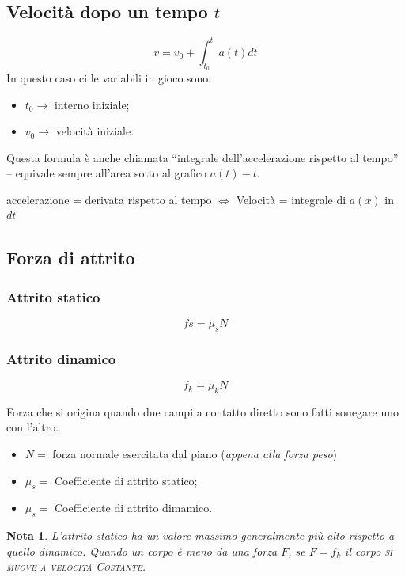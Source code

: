 \documentclass{book}
\newtheorem{nota}{Nota}[section]
\begin{document}
\subsection{Velocità dopo un tempo $t$}
\label{sec:veldopotempt}
\begin{equation}
  \label{eq:veldopuntemptacvar}
  v=v_0+\int^t_{t_0}a(t)dt
\end{equation}
In questo caso ci le variabili in gioco sono:
\begin{itemize}
\item $t_0\to$ interno iniziale;
\item $v_0\to$ velocità iniziale.
\end{itemize}
Questa formula è anche chiamata ``integrale dell'accelerazione rispetto al tempo'' -- equivale sempre all'area sotto al grafico $a(t)-t$.
\begin{center}
  accelerazione = derivata rispetto al tempo $\Leftrightarrow$ Velocità = integrale di $a(x)$ in $dt$
\end{center}

\subsection{Forza di attrito}
\label{sec:forzadiattr}
\begin{multicols}{2}
  \subsubsection{Attrito statico}
  \label{sec:attrstatico}
  \begin{equation}
    \label{eq:attrstatico}
    fs=\mu_sN
  \end{equation}
  
  \subsubsection{Attrito dinamico}
  \label{sec:attrdinamico}
  \begin{equation}
    \label{eq:attrdinamico}
    f_k=\mu_kN
  \end{equation}
\end{multicols}
Forza che si origina quando due campi a contatto diretto sono fatti souegare uno con l'altro.
\begin{itemize}
\item $N=$ forza normale esercitata dal piano (\textit{appena alla forza peso})
\item $\mu_s=$ Coefficiente di attrito statico;
\item $\mu_s=$ Coefficiente di attrito dimamico.
\end{itemize}
\begin{nota}
  L'attrito statico ha un valore massimo generalmente più alto rispetto a quello dinamico. Quando un corpo è meno da una forza $F$, se $F=f_k$ il corpo \textsc{si muove a velocità Costante}. 
\end{nota}
\end{document}
